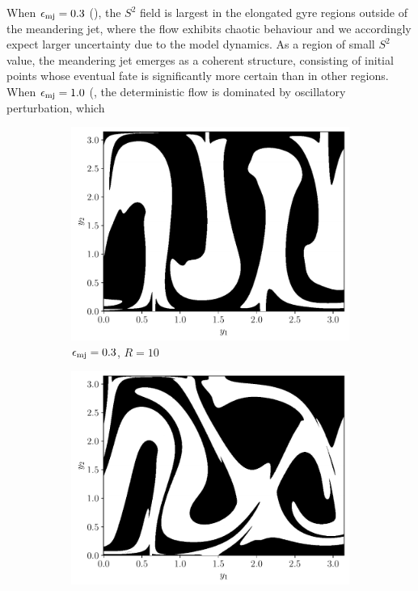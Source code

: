 When \(\epsilon_{\mathrm{mj}} = 0.3\) (), the \(S^2\) field is largest in the elongated gyre regions outside of the meandering jet, where the flow exhibits chaotic behaviour \citep{Pierrehumbert_1991_ChaoticMixingTracer} and we accordingly expect larger uncertainty due to the model dynamics.
As a region of small \(S^2\) value, the meandering jet emerges as a coherent structure, consisting of initial points whose eventual fate is significantly more certain than in other regions.
When \(\epsilon_{\mathrm{mj}} = 1.0\) (, the deterministic flow is dominated by oscillatory perturbation, which

\begin{figure}
	\begin{center}
		\begin{subfigure}{0.49\textwidth}
			\includegraphics[width=\textwidth]{chp04_paper_numerics/figures/rossby/S2_robust_0.3.pdf}
			\caption{\(\epsilon_{\mathrm{mj}} = 0.3\), \(R = 10\)}
		\end{subfigure}
		\begin{subfigure}{0.49\textwidth}
			\includegraphics[width=\textwidth]{chp04_paper_numerics/figures/rossby/S2_robust_1.0.pdf}

\end{subfigure}
\end{center}
\end{figure}
